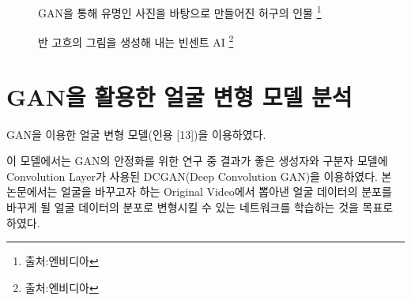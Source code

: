 \documentclass{oblivoir}
\begin{document}
\begin{figure}[h!]
\centering
\caption{GAN을 통해 유명인 사진을 바탕으로 만들어진 허구의 인물 \protect\footnote{출처:엔비디아}}
\end{figure}


\begin{figure}[h!]
\centering
\caption{반 고흐의 그림을 생성해 내는 빈센트 AI \protect\footnote{출처:엔비디아}}
\end{figure}


\section{ GAN을 활용한 얼굴 변형 모델 분석}

GAN을 이용한 얼굴 변형 모델(인용 [13])을 이용하였다.

이 모델에서는 GAN의 안정화를 위한 연구 중 결과가 좋은 생성자와 구분자 모델에 Convolution Layer가 사용된 DCGAN(Deep Convolution GAN)을 이용하였다. 본 논문에서는 얼굴을 바꾸고자 하는 Original Video에서 뽑아낸 얼굴 데이터의 분포를 바꾸게 될 얼굴 데이터의 분포로 변형시킬 수 있는 네트워크를 학습하는 것을 목표로 하였다.
\end{document}
